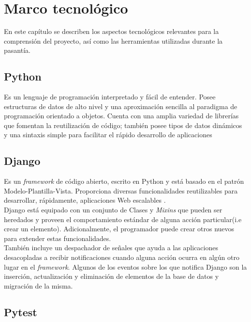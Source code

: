 \chapter{\textbf{Marco tecnológico}}

\thispagestyle{empty}

En este capítulo se describen los aspectos tecnológicos relevantes para la
comprensión del proyecto, así como las herramientas utilizadas durante la
pasantía.


\section{Python}

Es un lenguaje de programación interpretado y fácil de entender. Posee
estructuras de datos de alto nivel y una aproximación sencilla al paradigma de
programación orientado a objetos. Cuenta con una amplia variedad de librerías
que fomentan la reutilización de código; también posee tipos de datos dinámicos
y una sintaxis simple para facilitar el rápido desarrollo de aplicaciones
 \cite{Python_tutorial}

\section{Django}

Es un \textit{framework} de código abierto, escrito en Python y está basado en
el patrón Modelo-Plantilla-Vista. Proporciona diversas funcionalidades
reutilizables para desarrollar, rápidamente, aplicaciones Web escalables
\cite{MVT}. \\ %

Django está equipado con un conjunto de Clases y \textit{Mixins} que pueden ser
heredados y proveen el comportamiento estándar de alguna acción particular(i.e
crear un elemento). Adicionalmente, el programador puede crear otros nuevos
para extender estas funcionalidades. \\

También incluye un despachador de señales que ayuda a las aplicaciones
desacopladas a recibir notificaciones cuando alguna acción ocurra en algún otro
lugar en el \textit{framework}. Algunos de los  eventos sobre los que notifica
Django son la inserción, actualización y eliminación de elementos de la base de
datos y migración de la misma.

\section{Pytest}

